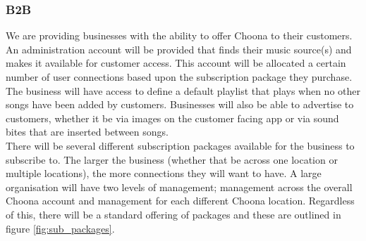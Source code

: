 \subsubsection{B2B}
We are providing businesses with the ability to offer Choona to their customers.  An administration account will be provided that finds their music source(s) and makes it available for customer access.  This account will be allocated a certain number of user connections based upon the subscription package they purchase.  The business will have access to define a default playlist that plays when no other songs have been added by customers.  Businesses will also be able to advertise to customers, whether it be via images on the customer facing app or via sound bites that are inserted between songs.  \\
There will be several different subscription packages available for the business to subscribe to.  The larger the business (whether that be across one location or multiple locations), the more connections they will want to have.  A large organisation will have two levels of management; management across the overall Choona account and management for each different Choona location.  Regardless of this, there will be a standard offering of packages and these are outlined in figure \ref{fig:sub_packages}.  \\

\noindent{}\\

